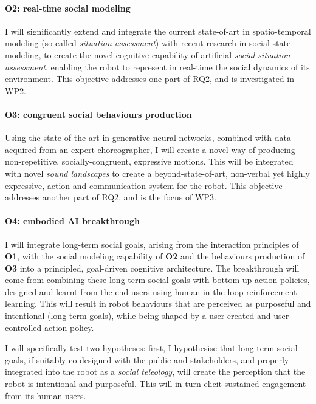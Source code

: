 \paragraph{\bf O2: real-time social modeling} I will significantly extend and integrate
the current state-of-art in spatio-temporal modeling (so-called \emph{situation
assessment}) with recent research in social state modeling, to create the novel
cognitive capability of artificial \emph{social situation assessment}, enabling
the robot to represent in real-time the social dynamics of its environment. This
objective addresses one part of RQ2, and is investigated in WP2.

\paragraph{\bf O3: congruent social behaviours production} Using the
state-of-the-art in generative neural networks, combined with data acquired from
an expert choreographer, I will create a novel way of producing non-repetitive,
socially-congruent, expressive motions. This will be integrated with novel
\emph{sound landscapes} to create a beyond-state-of-art, non-verbal yet highly
expressive,  action and communication system for the robot. This objective
addresses another part of RQ2, and is the focus of WP3.

\paragraph{\bf O4: embodied AI breakthrough} I will integrate long-term social
goals, arising from the interaction principles of \textbf{O1}, with the social
modeling capability of \textbf{O2} and the behaviours production of \textbf{O3}
into a principled, goal-driven cognitive architecture. The breakthrough will
come from combining these long-term social goals with bottom-up action policies,
designed and learnt from the end-users using human-in-the-loop reinforcement learning.
This will result in robot behaviours that are perceived as purposeful and
intentional (long-term goals), while being shaped by a
user-created and user-controlled action policy.

I will specifically test \ul{two hypotheses}: first, I hypothesise that long-term
social goals, if suitably co-designed with the public and stakeholders, and
properly integrated into the robot as a \emph{social teleology}, will create the
perception that the robot is intentional and purposeful. This will in turn
elicit sustained engagement from its human users.

